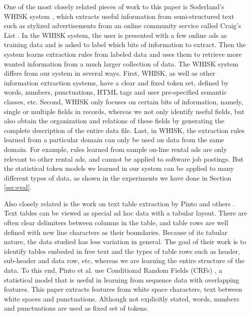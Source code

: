One of the most closely related pieces of work to this paper is Soderland's WHISK
system \cite{soderland:whisk}, which extracts useful information from
semi-structured text such as stylized advertisements from an online community
service called Craig's List \cite{craigslist}.
In the WHISK system, the user is presented with a few online ads as training data 
and is asked to label which bits of information to extract. Then the system learns
extraction rules from labeled data and uses them to retrieve more wanted
information from a much larger collection of data. 
The WHISK system differs from our system in several ways. 
First, WHISK, as well as other information extraction systems,
have a clear and fixed token set, defined by words, numbers, punctuations, 
HTML tags and user pre-specified semantic classes, etc. 
Second, WHISK only focuses on certain bits of
information, namely, single or multiple fields in records, 
whereas we not only identify useful fields, but also obtain the 
organization and relations of these fields by generating the complete 
description of the entire data file. 
Last, in WHISK, the extraction rules learned from a particular domain can only
be used on data from the same domain. For example, rules learned from
sample on-line rental
ads are only relevant to other rental ads, and cannot be applied to
software job postings. But the statistical token models we learned in our system can be
applied to many different types of data, as shown in the experiments we
have done in Section \ref{sec:eval}.  


Also closely related is the work on text table extraction by
Pinto and others \cite{Pinto+:texttables}. Text tables can
be viewed as special ad hoc data with a tabular layout. There are
often clear delimiters between columns in the table, and table rows
are well defined with new line characters as their boundaries.
Because of its tabular nature, the data studied has less variation in general. 
The goal of their work  
is to identify tables embeded in free text and the types of table rows 
such as header, sub-header and data row, etc, whereas we are learning the entire
structure of the data. 
To this end, Pinto et al. use Conditional Random Fields (CRFs) \cite{LaffertyMP01:CRF},
a statistical model that is useful in learning from sequence data with overlapping features.
This paper extracts features from white space characters,
text between white spaces and punctuations. Although not explicitly
stated, words, numbers and punctuations are used as fixed set of tokens. 
 
